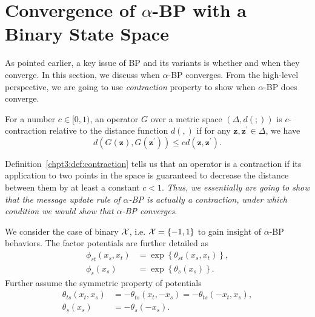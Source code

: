 \section{Convergence of $\alpha$-BP with a Binary State Space}\label{chpt3:sec:cnvg-thm}

As pointed earlier, a key issue of BP and its variants is whether and when they converge. In this section, we discuss when $\alpha$-BP converges. 
From the high-level perspective, we are going to use \textit{contraction} property to show when $\alpha$-BP does converge.
\begin{definition}\label{chpt3:def:contraction}
  For a number $c \in [0,1)$, an operator $G$ over a metric space $(\Delta, d(;))$ is $c$-contraction relative to the distance function $d(,)$ if for any $\bm{z}, \bm{z}^{\prime} \in \Delta$, we have
  \begin{equation}
    d(G(\bm{z}), G(\bm{z}^{\prime})) \leq c d(\bm{z}, \bm{z}^{\prime}).
  \end{equation}
\end{definition}
Definition~\ref{chpt3:def:contraction} tells us that an operator is a contraction if its application to two points in the space is guaranteed to decrease the distance between them by at least a constant $c < 1$. \textit{Thus, we essentially are going to show that the message update rule of $\alpha$-BP is actually a contraction, under which condition we would show that $\alpha$-BP converges}.

We consider the case of binary $\mathcal{X}$, i.e. $\mathcal{X}=\left\{ -1, 1 \right\}$ to gain insight of $\alpha$-BP behaviors. The factor potentials are further detailed as
\begin{align}
  \phi_{st}(x_s, x_t) &= \exp\left\{ \theta_{st}(x_s, x_t)\right\}, \nonumber \\
  \phi_{s}(x_s) &= \exp\left\{ \theta_{s}(x_s) \right\}.
\end{align}
Further assume the symmetric property of potentials
\begin{align}
  \theta_{ts}(x_t, x_s) &= -\theta_{ts}(x_t, -x_s) = -\theta_{ts}(-x_t, x_s), \nonumber\\
  \theta_{s}(x_s) &= - \theta_s(-x_s).
\end{align}

